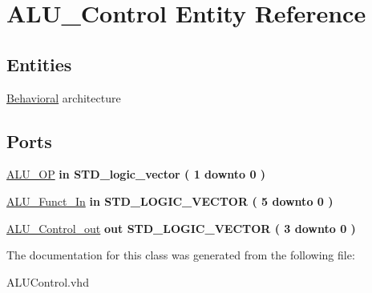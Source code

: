 \hypertarget{class_a_l_u___control}{\section{\-A\-L\-U\-\_\-\-Control \-Entity \-Reference}
\label{class_a_l_u___control}
}
\subsection*{\-Entities}
\begin{DoxyCompactItemize}
\item 
\hyperlink{class_a_l_u___control_1_1_behavioral}{\-Behavioral} architecture
\end{DoxyCompactItemize}
\*
\*
\subsection*{\-Ports}
 \begin{DoxyCompactItemize}
\item 
\hypertarget{class_a_l_u___control_ab5e38318e201e0011dc9fe806b2c9ea4}{\hyperlink{class_a_l_u___control_ab5e38318e201e0011dc9fe806b2c9ea4}{\-A\-L\-U\-\_\-\-O\-P}  {\bfseries {\bfseries in }} {\bfseries \-S\-T\-D\-\_\-logic\-\_\-vector (   1    downto    0  ) } }\label{class_a_l_u___control_ab5e38318e201e0011dc9fe806b2c9ea4}

\item 
\hypertarget{class_a_l_u___control_aa057cc5bea77eab736c8c526429fa204}{\hyperlink{class_a_l_u___control_aa057cc5bea77eab736c8c526429fa204}{\-A\-L\-U\-\_\-\-Funct\-\_\-\-In}  {\bfseries {\bfseries in }} {\bfseries \-S\-T\-D\-\_\-\-L\-O\-G\-I\-C\-\_\-\-V\-E\-C\-T\-O\-R (   5    downto    0  ) } }\label{class_a_l_u___control_aa057cc5bea77eab736c8c526429fa204}

\item 
\hypertarget{class_a_l_u___control_a770899168989eb2b8a2d815fbd0a3a17}{\hyperlink{class_a_l_u___control_a770899168989eb2b8a2d815fbd0a3a17}{\-A\-L\-U\-\_\-\-Control\-\_\-out}  {\bfseries {\bfseries out }} {\bfseries \-S\-T\-D\-\_\-\-L\-O\-G\-I\-C\-\_\-\-V\-E\-C\-T\-O\-R (   3    downto    0  ) } }\label{class_a_l_u___control_a770899168989eb2b8a2d815fbd0a3a17}

\end{DoxyCompactItemize}


\-The documentation for this class was generated from the following file\-:\begin{DoxyCompactItemize}
\item 
\-A\-L\-U\-Control.\-vhd\end{DoxyCompactItemize}
